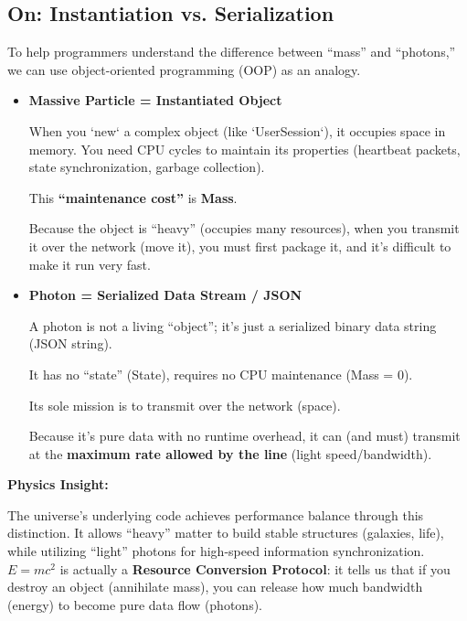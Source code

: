\subsection{On: Instantiation vs. Serialization}

To help programmers understand the difference between ``mass'' and ``photons,'' we can use object-oriented programming (OOP) as an analogy.

\begin{itemize}
\item \textbf{Massive Particle = Instantiated Object}

    When you `new` a complex object (like `UserSession`), it occupies space in memory. You need CPU cycles to maintain its properties (heartbeat packets, state synchronization, garbage collection).

    This \textbf{``maintenance cost''} is \textbf{Mass}.

    Because the object is ``heavy'' (occupies many resources), when you transmit it over the network (move it), you must first package it, and it's difficult to make it run very fast.

\item \textbf{Photon = Serialized Data Stream / JSON}

    A photon is not a living ``object''; it's just a serialized binary data string (JSON string).

    It has no ``state'' (State), requires no CPU maintenance (Mass = 0).

    Its sole mission is to transmit over the network (space).

    Because it's pure data with no runtime overhead, it can (and must) transmit at the \textbf{maximum rate allowed by the line} (light speed/bandwidth).
\end{itemize}

\textbf{Physics Insight:}

The universe's underlying code achieves performance balance through this distinction. It allows ``heavy'' matter to build stable structures (galaxies, life), while utilizing ``light'' photons for high-speed information synchronization. \textbf{$E=mc^2$} is actually a \textbf{Resource Conversion Protocol}: it tells us that if you destroy an object (annihilate mass), you can release how much bandwidth (energy) to become pure data flow (photons).


